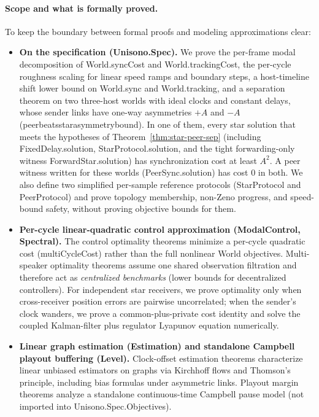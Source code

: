 \documentclass[11pt,a4paper]{article}
\DeclareRobustCommand{\lean}[1]{{\ttfamily\def\_{\textunderscore\allowbreak}#1}}
\theoremstyle{definition}
\begin{document}
\paragraph{Scope and what is formally proved.}
To keep the boundary between formal proofs and modeling approximations clear:
\begin{itemize}
\item \textbf{On the specification (\lean{Unisono.Spec}).} We prove the
  per-frame modal decomposition of \lean{World.syncCost} and
  \lean{World.trackingCost}, the per-cycle roughness scaling for linear speed
  ramps and boundary steps, a host-timeline shift lower bound on
  \lean{World.sync} and \lean{World.tracking}, and a separation theorem on two
  three-host worlds with ideal clocks and constant delays, whose sender links
  have one-way asymmetries $+A$ and $-A$
  (\lean{peer\_beats\_star\_asymmetry\_bound}). In one of them, every star
  solution that meets the hypotheses of Theorem~\ref{thm:star-peer-sep}
  (including \lean{FixedDelay.solution}, \lean{StarProtocol.solution}, and the
  tight forwarding-only witness \lean{ForwardStar.solution}) has
  synchronization cost at least $A^2$. A peer witness written for these worlds
  (\lean{PeerSync.solution}) has cost $0$ in both. We also define two
  simplified per-sample reference protocols (\lean{StarProtocol} and
  \lean{PeerProtocol}) and prove topology membership, non-Zeno progress, and
  speed-bound safety, without proving objective bounds for them.
\item \textbf{Per-cycle linear-quadratic control approximation
  (\lean{ModalControl}, \lean{Spectral}).} The control optimality theorems
  minimize a per-cycle quadratic cost (\lean{multiCycleCost}) rather than the
  full nonlinear \lean{World} objectives. Multi-speaker optimality theorems
  assume one shared observation filtration and therefore act as
  \emph{centralized benchmarks} (lower bounds for decentralized controllers).
  For independent star receivers, we prove optimality only when cross-receiver
  position errors are pairwise uncorrelated; when the sender's clock wanders,
  we prove a common-plus-private cost identity and solve the coupled
  Kalman-filter plus regulator Lyapunov equation numerically.
\item \textbf{Linear graph estimation (\lean{Estimation}) and standalone
  Campbell playout buffering (\lean{Level}).} Clock-offset estimation theorems
  characterize linear unbiased estimators on graphs via Kirchhoff flows and
  Thomson's principle, including bias formulas under asymmetric links.
  Playout margin theorems analyze a standalone continuous-time Campbell pause
  model (not imported into \lean{Unisono.Spec.Objectives}).
\end{itemize}
\end{document}
